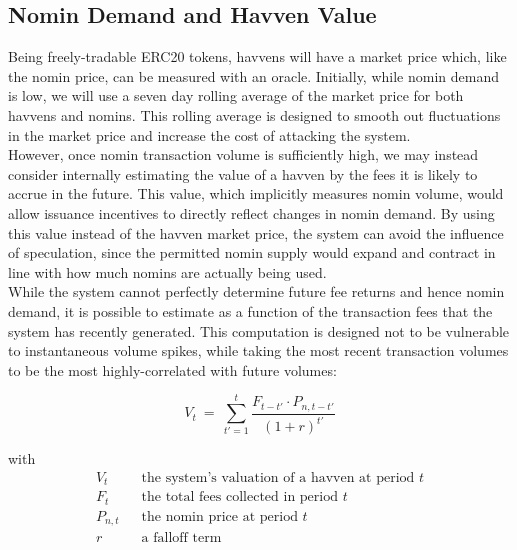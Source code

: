 \newpage

\subsection{Nomin Demand and Havven Value}

\noindent Being freely-tradable ERC20 tokens, havvens will have a market
price which, like the nomin price, can be measured with an oracle. Initially,
while nomin demand is low, we will use a seven day rolling average of the
market price for both havvens and nomins. This rolling average is designed to
smooth out fluctuations in the market price and increase the cost of
attacking the system.\\

\noindent However, once nomin transaction volume is sufficiently high, we may
instead consider internally estimating the value of a havven by the fees it
is likely to accrue in the future. This value, which implicitly measures
nomin volume, would allow issuance incentives to directly reflect changes in
nomin demand. By using this value instead of the havven market price, the
system can avoid the influence of speculation, since the permitted nomin
supply would expand and contract in line with how much nomins are actually
being used. \\

\noindent While the system cannot perfectly determine future fee returns and
hence nomin demand, it is possible to estimate as a function of the
transaction fees that the system has recently generated. This computation is
designed not to be vulnerable to instantaneous volume spikes, while taking
the most recent transaction volumes to be the most highly-correlated with
future volumes:
\vspace{3mm}

\begin{equation}
    V_{t} \ = \ \sum_{t'=1}^{t} \frac{F_{t - t'} \cdot P_{n,t - t'}}{{(1 + r)}^{t'}} \label{eq:price}
\end{equation}

with
\begin{align*} 
V_{t} \ \ & \text{ the system's valuation of a havven at period } t  \\
F_t \ \ & \text{ the total fees collected in period } t\\
P_{n,t} \ \ & \text{ the nomin price at period } t\\
r \ \ & \text{ a falloff term}  \\
\end{align*}

